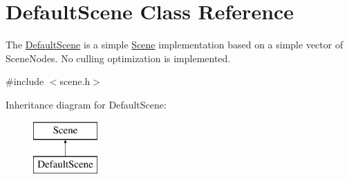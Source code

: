 \hypertarget{class_default_scene}{}\section{Default\+Scene Class Reference}
\label{class_default_scene}


The \hyperlink{class_default_scene}{Default\+Scene} is a simple \hyperlink{class_scene}{Scene} implementation based on a simple vector of Scene\+Nodes. No culling optimization is implemented.  




{\ttfamily \#include $<$scene.\+h$>$}

Inheritance diagram for Default\+Scene\+:\begin{figure}[H]
\begin{center}
\leavevmode
\includegraphics[height=2.000000cm]{class_default_scene}
\end{center}
\end{figure}
